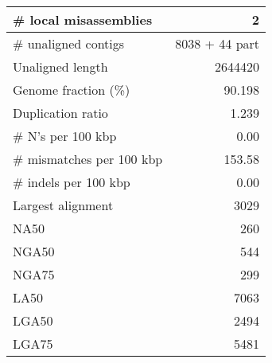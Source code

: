 \documentclass[12pt,a4paper]{article}
\begin{document}
\begin{table}[ht]
\begin{center}
\begin{tabular}{|l*{1}{|r}|}
\# local misassemblies & 2 \\ \hline
\# unaligned contigs & 8038 + 44 part \\ \hline
Unaligned length & 2644420 \\ \hline
Genome fraction (\%) & 90.198 \\ \hline
Duplication ratio & 1.239 \\ \hline
\# N's per 100 kbp & 0.00 \\ \hline
\# mismatches per 100 kbp & 153.58 \\ \hline
\# indels per 100 kbp & 0.00 \\ \hline
Largest alignment & 3029 \\ \hline
NA50 & 260 \\ \hline
NGA50 & 544 \\ \hline
NGA75 & 299 \\ \hline
LA50 & 7063 \\ \hline
LGA50 & 2494 \\ \hline
LGA75 & 5481 \\ \hline
\end{tabular}
\end{center}
\end{table}
\end{document}
